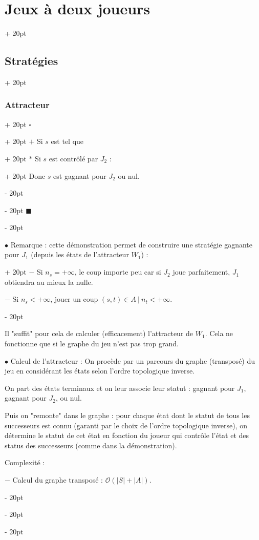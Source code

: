 \documentclass[a4paper, 12pt, twoside]{article}
\newcommand{\abs}[1]{\left\lvert #1 \right\rvert}
\newcommand{\ind}[1][20pt]{\advance\leftskip + #1}
\newcommand{\deind}[1][20pt]{\advance\leftskip - #1}
\newenvironment{indt}[2][20pt]{#2 \par \ind[#1]}{\par \deind} %
\newenvironment{proof}[1][{}]{\begin{indt}{$\square$ #1}}{$\blacksquare$ \end{indt}}
\begin{document}
\begin{indt}{\section{Jeux à deux joueurs}}
\begin{indt}{\subsection{Stratégies}}
\begin{indt}{\subsubsection{Attracteur}}
\begin{proof}
\begin{indt}{$+$ Si $s$ est tel que}
\begin{indt}{$*$ Si $s$ est contrôlé par $J_2$ :}
                            Donc $s$ est gagnant pour $J_2$ ou nul.
                        \end{indt}
                    \end{indt}
                \end{proof}

                \vspace{12pt}
                
                \begin{indt}{$\bullet$ Remarque : cette démonstration permet de construire une stratégie gagnante pour $J_1$ (depuis les états de l'attracteur $W_1$) :}
                    $-$ Si $n_s = +\infty$, le coup importe peu car si $J_2$ joue parfaitement, $J_1$ obtiendra au mieux la nulle.

                    $-$ Si $n_s < +\infty$, jouer un coup $(s, t) \in A\ |\ n_t < +\infty$.
                \end{indt}

                Il "suffit" pour cela de calculer (efficacement) l'attracteur de $W_1$. Cela ne fonctionne que si le graphe du jeu n'est pas trop grand.

                

                \vspace{12pt}
                
                $\bullet$ Calcul de l'attracteur :
                On procède par un parcours du graphe (transposé) du jeu en considérant les états selon l'ordre topologique inverse.

                On part des états terminaux et on leur associe leur statut : gagnant pour $J_1$, gagnant pour $J_2$, ou nul.

                Puis on "remonte" dans le graphe : pour chaque état dont le statut de tous les successeurs est connu (garanti par le choix de l'ordre topologique inverse), on détermine le statut de cet état en fonction du joueur qui contrôle l'état et des status des successeurs (comme dans la démonstration).

                \vspace{6pt}
                
                Complexité :

                $-$ Calcul du graphe transposé : $\mathcal O(\abs S + \abs A)$.


\end{indt}
\end{indt}
\end{indt}
\end{document}
